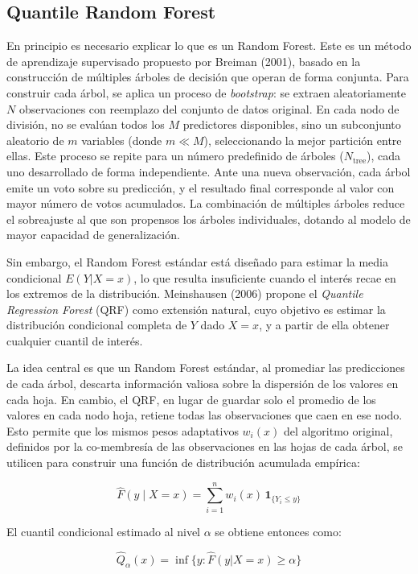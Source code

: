 ﻿\documentclass[11pt,a4paper]{article}
\begin{document}
\subsection{Quantile Random Forest}

En principio es necesario explicar lo que es un Random Forest. Este es un método de aprendizaje supervisado propuesto por Breiman (2001), basado en la construcción de múltiples árboles de decisión que operan de forma conjunta. Para construir cada árbol, se aplica un proceso de \textit{bootstrap}: se extraen aleatoriamente $N$ observaciones con reemplazo del conjunto de datos original. En cada nodo de división, no se evalúan todos los $M$ predictores disponibles, sino un subconjunto aleatorio de $m$ variables (donde $m \ll M$), seleccionando la mejor partición entre ellas. Este proceso se repite para un número predefinido de árboles ($N_\text{tree}$), cada uno desarrollado de forma independiente. Ante una nueva observación, cada árbol emite un voto sobre su predicción, y el resultado final corresponde al valor con mayor número de votos acumulados. La combinación de múltiples árboles reduce el sobreajuste al que son propensos los árboles individuales, dotando al modelo de mayor capacidad de generalización.

Sin embargo, el Random Forest estándar está diseñado para estimar la media condicional $E(Y|X=x)$, lo que resulta insuficiente cuando el interés recae en los extremos de la distribución. Meinshausen (2006) propone el \textit{Quantile Regression Forest} (QRF) como extensión natural, cuyo objetivo es estimar la distribución condicional completa de $Y$ dado $X=x$, y a partir de ella obtener cualquier cuantil de interés.

La idea central es que un Random Forest estándar, al promediar las predicciones de cada árbol, descarta información valiosa sobre la dispersión de los valores en cada hoja. En cambio, el QRF, en lugar de guardar solo el promedio de los valores en cada nodo hoja, retiene todas las observaciones que caen en ese nodo. Esto permite que los mismos pesos adaptativos $w_i(x)$ del algoritmo original, definidos por la co-membresía de las observaciones en las hojas de cada árbol, se utilicen para construir una función de distribución acumulada empírica:

\[
\hat{F}(y \mid X=x)=\sum_{i=1}^{n} w_i(x)\,\mathbf{1}_{\{Y_i \leq y\}}
\]

El cuantil condicional estimado al nivel $\alpha$ se obtiene entonces como:

\[
\hat{Q}_\alpha(x)=\inf\{y:\hat{F}(y|X=x)\geq \alpha\}
\]
\end{document}
